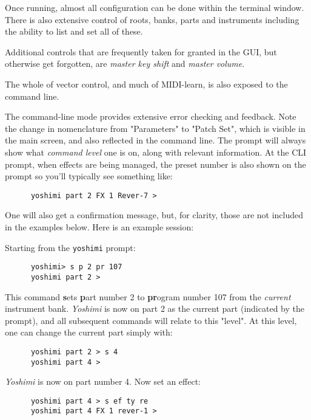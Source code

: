    Once running, almost all configuration can be done within the terminal
   window.  There is also extensive control of roots, banks, parts and
   instruments including the ability to list and set all of these.

   Additional controls that are frequently taken for granted in the GUI, but
   otherwise get forgotten, are \textsl{master key shift} and \textsl{master
   volume}.

   The whole of vector control, and much of MIDI-learn, is also exposed to the
   command line.

   The command-line mode provides extensive error checking and feedback.
   Note the change in nomenclature from "Parameters" to "Patch Set", which is
   visible in the main screen, and also reflected in the command line.
   The prompt will always show what \textsl{command level}
   one is on, along with relevant information.
   At the CLI prompt, when effects are being managed, the preset number is also
   shown on the prompt so you'll typically see something like:

   \begin{verbatim}
      yoshimi part 2 FX 1 Rever-7 >
   \end{verbatim}

   One will also get a confirmation message, but, for clarity,
   those are not included in the examples below.
   Here is an example session:

   Starting from the \texttt{yoshimi} prompt:

   \begin{verbatim}
      yoshimi> s p 2 pr 107
      yoshimi part 2 >
   \end{verbatim}

   This command \textbf{s}ets \textbf{p}art number 2 to \textbf{pr}ogram
   number 107 from the \textsl{current} instrument bank.
   \textsl{Yoshimi} is now on part 2 as the current part (indicated by the
   prompt), and all subsequent commands will relate to this "level".
   At this level, one can change the current part simply with:

   \begin{verbatim}
      yoshimi part 2 > s 4
      yoshimi part 4 >
   \end{verbatim}

   \textsl{Yoshimi} is now on part number 4. Now set an effect:

   \begin{verbatim}
      yoshimi part 4 > s ef ty re
      yoshimi part 4 FX 1 rever-1 >
   \end{verbatim}

